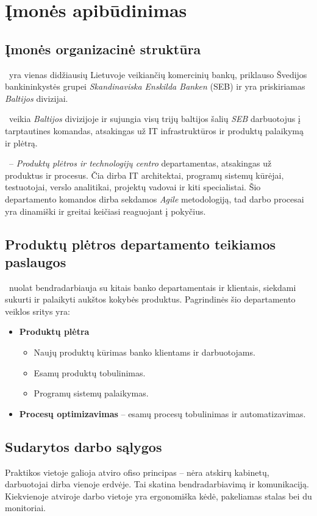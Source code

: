 \section{Įmonės apibūdinimas}

\subsection{Įmonės organizacinė struktūra}
\SEB~yra vienas didžiausių Lietuvoje veikiančių komercinių bankų, priklauso Švedijos bankininkystės grupei \textit{Skandinaviska Enskilda Banken} (SEB) ir yra priskiriamas \textit{Baltijos} divizijai. 

\PDT~veikia \textit{Baltijos} divizijoje ir sujungia visų trijų baltijos šalių \textit{SEB} darbuotojus į tarptautines komandas, atsakingas už IT infrastruktūros ir produktų palaikymą ir plėtrą.

\PD~-- \textit{Produktų plėtros ir technologijų centro} departamentas, atsakingas už produktus ir procesus. Čia dirba IT architektai, programų sistemų kūrėjai, testuotojai, verslo analitikai, projektų vadovai ir kiti specialistai. Šio departamento komandos dirba sekdamos \textit{Agile} \cite{cohenIntroductionAgileMethods2004} metodologiją, tad darbo procesai yra dinamiški ir greitai keičiasi reaguojant į pokyčius.

\subsection{Produktų plėtros departamento teikiamos paslaugos}

\PD~nuolat bendradarbiauja su kitais banko departamentais ir klientais, siekdami sukurti ir palaikyti aukštos kokybės produktus. Pagrindinės šio departamento veiklos sritys yra:
\begin{itemize}
    \item \textbf{Produktų plėtra}
    \begin{itemize}
        \item Naujų produktų kūrimas banko klientams ir darbuotojams.
        \item Esamų produktų tobulinimas.
        \item Programų sistemų palaikymas.
    \end{itemize}
    \item \textbf{Procesų optimizavimas} -- esamų procesų tobulinimas ir automatizavimas.
\end{itemize}

\subsection{Sudarytos darbo sąlygos}
Praktikos vietoje galioja atviro ofiso  principas -- nėra atskirų kabinetų, darbuotojai dirba vienoje erdvėje. Tai skatina bendradarbiavimą ir komunikaciją. Kiekvienoje atviroje darbo vietoje yra ergonomiška kėdė, pakeliamas stalas bei du monitoriai.